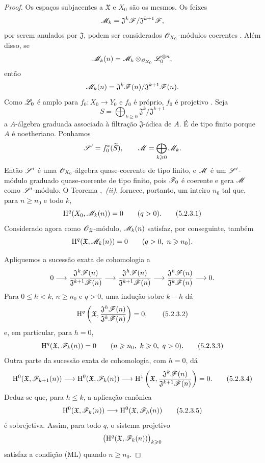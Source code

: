 \begin{proof}
Os espaços subjacentes a $\mathfrak{X}$ e $X_0$ são os mesmos.
Os feixes
\[
  \mathscr{M}_k
  =
  \mathfrak{J}^k\mathscr{F}/\mathfrak{J}^{k+1}\mathscr{F},
\]
por serem anulados por $\mathfrak{J}$, podem ser considerados
$\mathscr{O}_{X_0}$-módulos coerentes . Além disso, se
\[
  \mathscr{M}_k(n)
  =
  \mathscr{M}_k\otimes_{\mathscr{O}_{X_0}}\mathscr{L}_0^{\otimes n},
\]
então
\[
  \mathscr{M}_k(n)
  =
  \mathfrak{J}^k\mathscr{F}(n)/
  \mathfrak{J}^{k+1}\mathscr{F}(n).
\]
Como $\mathscr{L}_0$ é amplo para $f_0:X_0\to Y_0$ e $f_0$ é
próprio,
$f_0$ é projetivo . Seja
\[
  S=\bigoplus_{k\geq0}
  \mathfrak{J}^k/\mathfrak{J}^{k+1}
\]
a $A$-álgebra graduada associada à
filtração $\mathfrak{J}$-ádica de $A$. É de tipo finito
porque $A$ é noetheriano. Ponhamos
\[
  \mathscr{S}'=f_0^*(\widetilde{S}),\qquad
  \mathscr{M}=\bigoplus_{k\geqslant0}\mathscr{M}_k.
\]
Então $\mathscr{S}'$ é uma $\mathscr{O}_{X_0}$-álgebra quase-coerente de
tipo finito, e $\mathscr{M}$ é um $\mathscr{S}'$-módulo graduado
quase-coerente de tipo finito, pois $\mathscr{F}_0$ é coerente e
gera $\mathscr{M}$ como $\mathscr{S}'$-módulo. O Teorema
,~\emph{(ii)}, fornece, portanto, um inteiro $n_0$
tal que, para $n\geq n_0$ e todo $k$,
\[
  \HH^q(X_0,\sh{M}_k(n))=0
  \qquad(q>0).
  \tag{5.2.3.1}
  \label{III.5.2.3.1}
\]
Considerado agora como $\mathscr{O}_{\mathfrak{X}}$-módulo,
$\mathscr{M}_k(n)$ satisfaz, por conseguinte, também
\[
  \mathrm{H}^q(\mathfrak{X},\mathscr{M}_k(n))=0
  \qquad(q>0,\ n\geqslant n_0).
\]

Apliquemos a sucessão exata de cohomologia a
\[
  0\longrightarrow
  \frac{\mathfrak{J}^k\mathscr{F}(n)}
       {\mathfrak{J}^{k+1}\mathscr{F}(n)}
  \longrightarrow
  \frac{\mathfrak{J}^h\mathscr{F}(n)}
       {\mathfrak{J}^{k+1}\mathscr{F}(n)}
  \longrightarrow
  \frac{\mathfrak{J}^h\mathscr{F}(n)}
       {\mathfrak{J}^{k}\mathscr{F}(n)}
  \longrightarrow0.
\]
Para $0\leq h<k$, $n\geq n_0$ e $q>0$, uma indução sobre $k-h$
dá
\[
  \HH^q\left(
    \mathfrak{X},
    \frac{\mathfrak{J}^h\sh{F}(n)}
         {\mathfrak{J}^{k}\sh{F}(n)}
  \right)=0,
  \tag{5.2.3.2}
  \label{III.5.2.3.2}
\]
e, em particular, para $h=0$,
\[
  \HH^q(\mathfrak{X},\sh{F}_k(n))=0
  \qquad(n\geq n_0,\ k\geq0,\ q>0).
  \tag{5.2.3.3}
  \label{III.5.2.3.3}
\]
Outra parte da sucessão exata de cohomologia, com $h=0$, dá
\[
  \HH^0(\mathfrak{X},\sh{F}_{k+1}(n))
  \longrightarrow
  \HH^0(\mathfrak{X},\sh{F}_k(n))
  \longrightarrow
  \HH^1\left(
    \mathfrak{X},
    \frac{\mathfrak{J}^k\sh{F}(n)}
         {\mathfrak{J}^{k+1}\sh{F}(n)}
  \right)
  =0.
  \tag{5.2.3.4}
  \label{III.5.2.3.4}
\]
Deduz-se que, para $h\leq k$, a aplicação canônica
\[
  \HH^0(\mathfrak{X},\sh{F}_k(n))
  \longrightarrow
  \HH^0(\mathfrak{X},\sh{F}_h(n))
  \tag{5.2.3.5}
  \label{III.5.2.3.5}
\]
é sobrejetiva. Assim, para todo $q$, o sistema projetivo
\[
  \bigl(\mathrm{H}^q(\mathfrak{X},\mathscr{F}_k(n))\bigr)_{k\geqslant0}
\]
satisfaz a condição (ML) quando $n\geq n_0$.


\end{proof}
